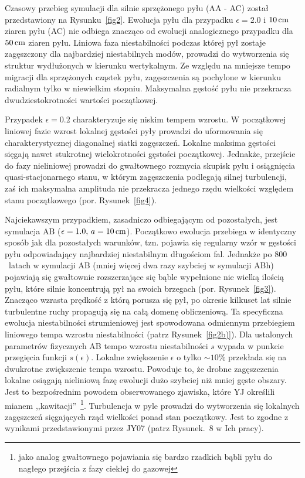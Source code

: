 Czasowy przebieg symulacji dla silnie sprzężonego pyłu (AA - AC) został
przedstawiony na Rysunku~\ref{fig2}. Ewolucja pyłu dla przypadku $\epsilon =
2.0$ i $10\hbox{$\thinspace\textrm{cm}$}$ ziaren pyłu (AC) nie odbiega znacząco od ewolucji analogicznego
przypadku dla $50\hbox{$\thinspace\textrm{cm}$}$ ziaren pyłu. Liniowa faza niestabilności podczas której
pył zostaje zagęszczony dla najbardziej niestabilnych modów, prowadzi do
wytworzenia się struktur wydłużonych w kierunku wertykalnym. Ze względu na
mniejsze tempo migracji dla sprzężonych cząstek pyłu, zagęszczenia są pochylone
w kierunku radialnym tylko w niewielkim stopniu. Maksymalna gęstość pyłu nie
przekracza dwudziestokrotności wartości początkowej.
\par Przypadek $\epsilon = 0.2$ charakteryzuje się niskim tempem wzrostu. W
początkowej liniowej fazie wzrost lokalnej gęstości pyły prowadzi do uformowania
się charakterystycznej diagonalnej siatki zagęszczeń. Lokalne maksima gęstości
sięgają nawet stukrotnej wielokrotności gęstości początkowej. Jednakże, przejście
do fazy nieliniowej prowadzi do gwałtownego rozmycia skupisk pyłu i osiągnięcia
quasi-stacjonarnego stanu, w którym zagęszczenia podlegają silnej turbulencji,
zaś ich maksymalna amplituda nie przekracza jednego rzędu wielkości względem
stanu początkowego (por. Rysunek~\ref{fig4}).

\par Najciekawszym przypadkiem, zasadniczo odbiegającym od pozostałych, jest
symulacja AB ($\epsilon=1.0,\, a=10\hbox{$\thinspace\textrm{cm}$}$). Początkowo ewolucja przebiega w
identyczny sposób jak dla pozostałych warunków, tzn. pojawia się regularny wzór
w gęstości pyłu odpowiadający najbardziej niestabilnym długościom fal. Jednakże 
po $800$~latach w symulacji AB (mniej więcej dwa razy szybciej w symulacji ABh)
pojawiają się gwałtownie rozszerzające się bąble wypełnione nie wielką ilością
pyłu, które silnie koncentrują pył na swoich brzegach (por. Rysunek~\ref{fig3}). 
Znacząco wzrasta prędkość z którą porusza się pył, po okresie kilkuset lat
silnie turbulentne ruchy propagują się na całą domenę obliczeniową. Ta
specyficzna ewolucja niestabilności strumieniowej jest spowodowana odmiennym
przebiegiem liniowego tempa wzrostu niestabilności (patrz Rysunek~\ref{fig2b)}).
Dla ustalonych parametrów fizycznych AB tempo wzrostu niestabilności $s$ wypada
w punkcie przegięcia funkcji $s(\epsilon)$. Lokalne zwiększenie $\epsilon$ o
tylko $\sim10\%$ przekłada się na dwukrotne zwiększenie tempa wzrostu. Powoduje
to, że drobne zagęszczenia lokalne osiągają nieliniową fazę ewolucji dużo
szybciej niż mniej gęste obszary.  Jest to bezpośrednim powodem obserwowanego
zjawiska, które YJ określili mianem ,,kawitacji''~\footnote{jako analog
gwałtownego pojawiania się bardzo rzadkich bąbli pyłu do nagłego przejścia z
fazy ciekłej do gazowej}.  Turbulencja w pyle prowadzi do wytworzenia się
lokalnych zagęszczeń sięgających rząd wielkości ponad stan początkowy. Jest to
zgodne z wynikami przedstawionymi przez JY07 (patrz Rysunek.~8 w Ich pracy).

